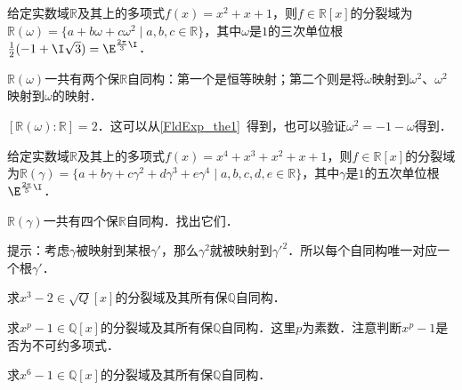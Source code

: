 \begin{example}{}
给定实数域$\mathbb{R}$及其上的多项式$f(x)=x^2+x+1$，则$f\in\mathbb{R}[x]$的分裂域为$\mathbb{R}(\omega)=\{a+b\omega+c\omega^2 \mid a, b, c\in\mathbb{R}\}$，其中$\omega$是$1$的三次单位根$\frac{1}{2}(-1+\I\sqrt{3})=\E^{\frac{2\pi}{3}\I}$．

$\mathbb{R}(\omega)$一共有两个保$\mathbb{R}$自同构：第一个是恒等映射；第二个则是将$\omega$映射到$\omega^2$、$\omega^2$映射到$\omega$的映射．

$[\mathbb{R}(\omega):\mathbb{R}]=2$．这可以从\autoref{FldExp_the1}~得到，也可以验证$\omega^2=-1-\omega$得到．
\end{example}



\begin{exercise}{}
给定实数域$\mathbb{R}$及其上的多项式$f(x)=x^4+x^3+x^2+x+1$，则$f\in\mathbb{R}[x]$的分裂域为$\mathbb{R}(\gamma)=\{a+b\gamma+c\gamma^2+d\gamma^3+e\gamma^4 \mid a, b, c, d, e\in\mathbb{R}\}$，其中$\gamma$是$1$的五次单位根$\E^{\frac{2\pi}{5}\I}$．

$\mathbb{R}(\gamma)$一共有四个保$\mathbb{R}$自同构．找出它们．

提示：考虑$\gamma$被映射到某根$\gamma'$，那么$\gamma^2$就被映射到$\gamma'^2$．所以每个自同构唯一对应一个根$\gamma'$．
\end{exercise}



\begin{exercise}{}
求$x^3-2\in\sqrt{Q}[x]$的分裂域及其所有保$\mathbb{Q}$自同构．
\end{exercise}



\begin{exercise}{}
求$x^p-1\in\mathbb{Q}[x]$的分裂域及其所有保$\mathbb{Q}$自同构．这里$p$为素数．注意判断$x^p-1$是否为不可约多项式．
\end{exercise}


\begin{exercise}{}
求$x^6-1\in\mathbb{Q}[x]$的分裂域及其所有保$\mathbb{Q}$自同构．
\end{exercise}














